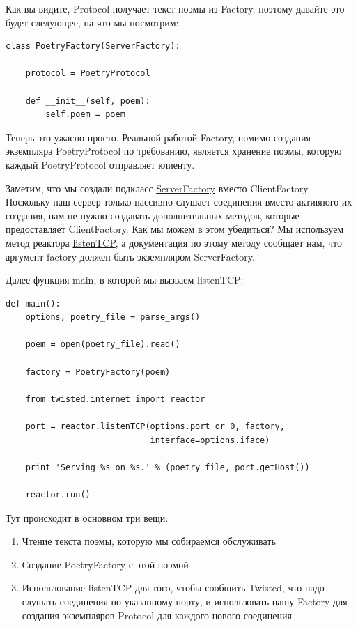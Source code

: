 Как вы видите, Protocol получает текст поэмы из Factory, 
поэтому давайте это будет следующее, на что мы посмотрим:

\begin{scriptsize}\begin{verbatim}
class PoetryFactory(ServerFactory):

    protocol = PoetryProtocol

    def __init__(self, poem):
        self.poem = poem
\end{verbatim}\end{scriptsize}


Теперь это ужасно просто. Реальной работой Factory, помимо создания 
экземпляра PoetryProtocol по требованию, является хранение поэмы, 
которую каждый PoetryProtocol отправляет клиенту.  


Заметим, что мы создали подкласс  
\href{http://twistedmatrix.com/trac/browser/tags/releases/twisted-8.2.0/twisted/internet/protocol.py#L317}{ServerFactory} 
вместо ClientFactory. Поскольку наш сервер только пассивно 
слушает соединения вместо активного их создания, нам не нужно 
создавать дополнительных методов, которые предоставляет ClientFactory. 
Как мы можем в этом убедиться? Мы используем метод реактора  
\href{http://twistedmatrix.com/trac/browser/tags/releases/twisted-8.2.0/twisted/internet/interfaces.py#L224}{listenTCP}, 
а документация по этому методу сообщает нам, что аргумент factory 
должен быть экземпляром ServerFactory.


Далее функция main, в которой мы вызваем listenTCP: 

\begin{scriptsize}\begin{verbatim}
def main():
    options, poetry_file = parse_args()

    poem = open(poetry_file).read()

    factory = PoetryFactory(poem)

    from twisted.internet import reactor

    port = reactor.listenTCP(options.port or 0, factory,
                             interface=options.iface)

    print 'Serving %s on %s.' % (poetry_file, port.getHost())

    reactor.run()
\end{verbatim}\end{scriptsize}


Тут происходит в основном три вещи:
\begin{enumerate}
\item Чтение текста поэмы, которую мы собираемся обслуживать
\item Создание PoetryFactory с этой поэмой
\item Использование listenTCP для того, чтобы сообщить Twisted, 
что надо слушать соединения по указанному порту, и использовать 
нашу Factory для создания экземпляров Protocol для каждого 
нового соединения.
\end{enumerate}

